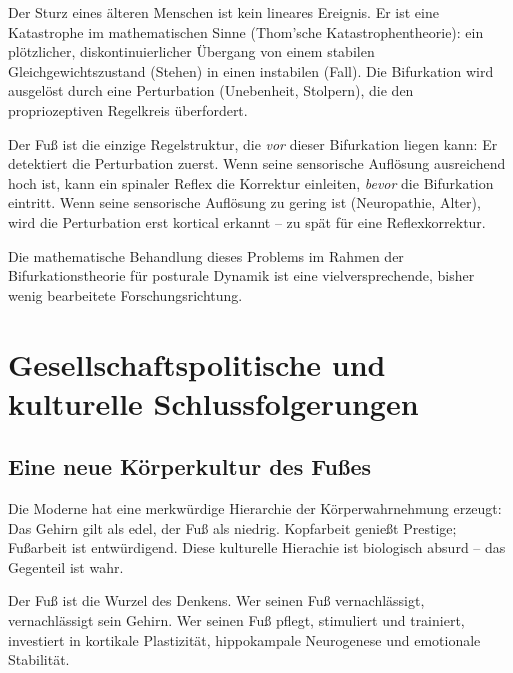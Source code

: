 ﻿\documentclass[12pt,a4paper]{report}
\theoremstyle{plain}
\theoremstyle{definition}
\theoremstyle{remark}
\begin{document}
Der Sturz eines älteren Menschen ist kein lineares Ereignis.
Er ist eine Katastrophe im mathematischen Sinne (Thom'sche
Katastrophentheorie): ein plötzlicher, diskontinuierlicher
Übergang von einem stabilen Gleichgewichtszustand (Stehen)
in einen instabilen (Fall). Die Bifurkation wird ausgelöst
durch eine Perturbation (Unebenheit, Stolpern), die den
propriozeptiven Regelkreis überfordert.

Der Fuß ist die einzige Regelstruktur, die \emph{vor} dieser
Bifurkation liegen kann: Er detektiert die Perturbation zuerst.
Wenn seine sensorische Auflösung ausreichend hoch ist, kann
ein spinaler Reflex die Korrektur einleiten, \emph{bevor} die
Bifurkation eintritt. Wenn seine sensorische Auflösung zu gering
ist (Neuropathie, Alter), wird die Perturbation erst kortical
erkannt -- zu spät für eine Reflexkorrektur.

Die mathematische Behandlung dieses Problems im Rahmen der
Bifurkationstheorie für posturale Dynamik ist eine
vielversprechende, bisher wenig bearbeitete Forschungsrichtung.

\section{Gesellschaftspolitische und kulturelle Schlussfolgerungen}

\subsection{Eine neue Körperkultur des Fußes}

Die Moderne hat eine merkwürdige Hierarchie der Körperwahrnehmung
erzeugt: Das Gehirn gilt als edel, der Fuß als niedrig. Kopfarbeit
genießt Prestige; Fußarbeit ist entwürdigend. Diese kulturelle
Hierachie ist biologisch absurd -- das Gegenteil ist wahr.

Der Fuß ist die Wurzel des Denkens. Wer seinen Fuß vernachlässigt,
vernachlässigt sein Gehirn. Wer seinen Fuß pflegt, stimuliert
und trainiert, investiert in kortikale Plastizität, hippokampale
Neurogenese und emotionale Stabilität.
\end{document}
